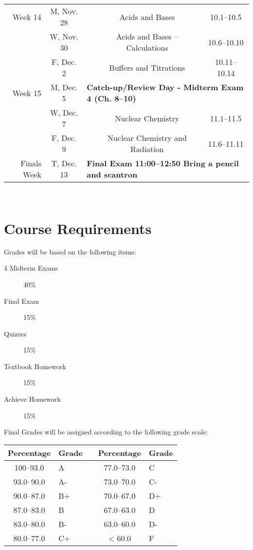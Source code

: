 \documentclass[12pt, letterpaper]{article}
\begin{document}
\begin{tabular}{rcccc}
	\midrule
	Week 14     & M, Nov. 28 &                                                                                  & Acids and Bases                    & 10.1--10.5   \\
	            & W, Nov. 30 &                                                                                  & Acids and Bases -- Calculations    & 10.6--10.10  \\
	            & F, Dec. 2  &                                                                                  & Buffers and Titrations             & 10.11--10.14 \\
	\midrule
	Week 15     & M, Dec. 5  & \multicolumn{3}{l}{\textbf{Catch-up/Review Day - Midterm Exam 4 (Ch. 8--10)}}                                                        \\
	            & W, Dec. 7  &                                                                                  & Nuclear Chemistry                  & 11.1--11.5   \\
	            & F, Dec. 9  &                                                                                  & Nuclear Chemistry and Radiation    & 11.6--11.11  \\
	\midrule
	Finals Week & T, Dec. 13 & \multicolumn{3}{l}{\textbf{Final Exam 11:00--12:50 Bring a pencil and scantron}}                                                     \\
\end{tabular}
~

\section*{Course Requirements}
Grades will be based on the following items:
\begin{description}
	\item[4 Midterm Exams] 40\%
	\item[Final Exam] 15\%
	\item[Quizzes] 15\%
	\item[Textbook Homework] 15\%
	\item[Achieve Homework] 15\%
\end{description}
Final Grades will be assigned according to the following grade scale:

\begin{tabular}{cl|c|cl}
	Percentage & Grade &  & Percentage & Grade \\ \midrule
	100--93.0  & A     &  & 77.0--73.0 & C     \\
	93.0--90.0 & A-    &  & 73.0--70.0 & C-    \\
	90.0--87.0 & B+    &  & 70.0--67.0 & D+    \\
	87.0--83.0 & B     &  & 67.0--63.0 & D     \\
	83.0--80.0 & B-    &  & 63.0--60.0 & D-    \\
	80.0--77.0 & C+    &  & < 60.0     & F
\end{tabular}
\end{document}
